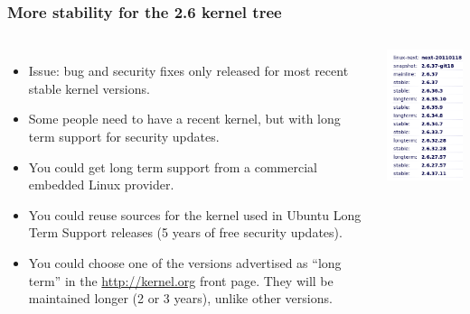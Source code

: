 \begin{frame}
  \frametitle{More stability for the 2.6 kernel tree}
  \begin{columns}
    \begin{itemize}
    \item Issue: bug and security fixes only released for most recent
      stable kernel versions.
    \item Some people need to have a recent kernel, but with long term
      support for security updates.
    \item You could get long term support from a commercial embedded
      Linux provider.
    \item You could reuse sources for the kernel used in Ubuntu Long
      Term Support releases (5 years of free security updates).
    \item You could choose one of the versions advertised as “long term”
      in the \url{http://kernel.org} front page. They will be maintained
      longer (2 or 3 years), unlike other versions.
    \end{itemize}
    \includegraphics[width=\textwidth]{slides/sysdev-linux-kernel-intro/stable-kernels.png}

\end{columns}
\end{frame}
